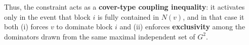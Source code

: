 Thus, the constraint acts as a \textbf{cover-type coupling inequality}: it activates only in the event that block $i$ is fully contained in $N(v)$, and in that case it both (i) forces $v$ to dominate block $i$ and (ii) enforces \textbf{exclusivity} among the dominators drawn from the same maximal independent set of $G^2$.
